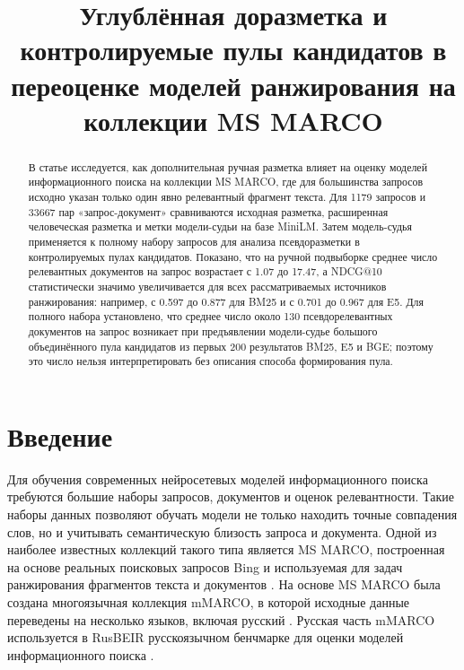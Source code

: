 \documentclass[runningheads,a4paper]{llncs}
\title{Углублённая доразметка и контролируемые пулы кандидатов в переоценке моделей ранжирования на коллекции MS MARCO}
\author{}
\institute{}
\begin{document}
\maketitle
\begin{abstract}
В статье исследуется, как дополнительная ручная разметка влияет на оценку моделей информационного поиска на коллекции MS MARCO, где для большинства запросов исходно указан только один явно релевантный фрагмент текста. Для 1179 запросов и 33667 пар «запрос-документ» сравниваются исходная разметка, расширенная человеческая разметка и метки модели-судьи на базе MiniLM. Затем модель-судья применяется к полному набору запросов для анализа псевдоразметки в контролируемых пулах кандидатов. Показано, что на ручной подвыборке среднее число релевантных документов на запрос возрастает с 1.07 до 17.47, а NDCG@10 статистически значимо увеличивается для всех рассматриваемых источников ранжирования: например, с 0.597 до 0.877 для BM25 и с 0.701 до 0.967 для E5. Для полного набора установлено, что среднее число около 130 псевдорелевантных документов на запрос возникает при предъявлении модели-судье большого объединённого пула кандидатов из первых 200 результатов BM25, E5 и BGE; поэтому это число нельзя интерпретировать без описания способа формирования пула.

\end{abstract}

\section{Введение}

Для обучения современных нейросетевых моделей информационного поиска требуются большие наборы запросов, документов и оценок релевантности. Такие наборы данных позволяют обучать модели не только находить точные совпадения слов, но и учитывать семантическую близость запроса и документа. Одной из наиболее известных коллекций такого типа является MS MARCO, построенная на основе реальных поисковых запросов Bing и используемая для задач ранжирования фрагментов текста и документов \cite{bajaj2016msmarco}. На основе MS MARCO была создана многоязычная коллекция mMARCO, в которой исходные данные переведены на несколько языков, включая русский \cite{bonifacio2022mmarco}. Русская часть mMARCO используется в RusBEIR \textemdash{} русскоязычном бенчмарке для оценки моделей информационного поиска \cite{2025rusbeir}.
\end{document}
